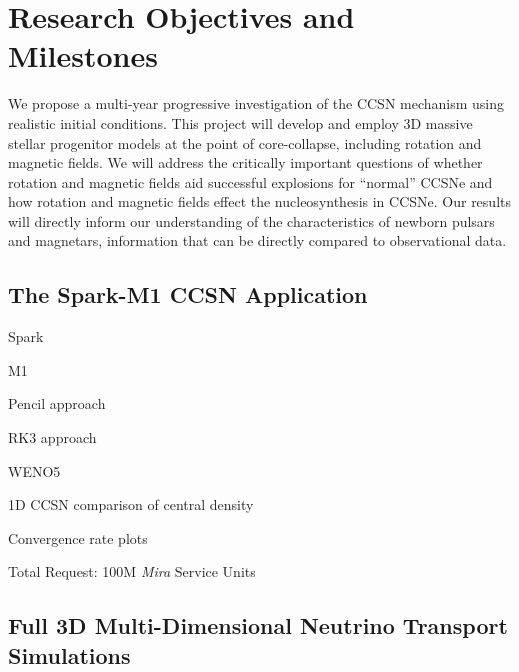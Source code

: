 \section{Research Objectives and Milestones}
\label{sec:objectives}

We propose a multi-year progressive investigation of the CCSN mechanism using realistic initial conditions.
This project will develop and employ 3D massive stellar progenitor models at the point of core-collapse, including rotation and magnetic fields.
We will address the critically important questions of whether rotation and magnetic fields aid successful explosions for ``normal'' CCSNe and how rotation and magnetic fields effect the nucleosynthesis in CCSNe.
Our results will directly inform our understanding of the characteristics of newborn pulsars and magnetars, information that can be directly compared to observational data.

\subsection{The Spark-M1 CCSN Application}

\citet{Couch:2017}

Spark

M1

Pencil approach

RK3 approach

WENO5

1D CCSN comparison of central density

Convergence rate plots

\vspace{0.1in}  Total Request: 100M {\it Mira} Service Units \vspace{-0.1in}


\subsection{Full 3D Multi-Dimensional Neutrino Transport Simulations}
\label{sec:3Dm1}


